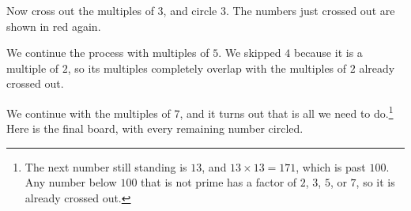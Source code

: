 Now cross out the multiples of $3$, and circle $3$. The numbers just crossed out are shown in red again.


We continue the process with multiples of $5$. We skipped $4$ because it is a multiple of $2$, so its multiples completely overlap with the multiples of $2$ already crossed out.


We continue with the multiples of $7$, and it turns out that is all we need to do.\footnote{The next number still standing is $13$, and $13 \times 13 = 171$, which is past $100$. Any number below $100$ that is not prime has a factor of $2$, $3$, $5$, or $7$, so it is already crossed out.} Here is the final board, with every remaining number circled.

